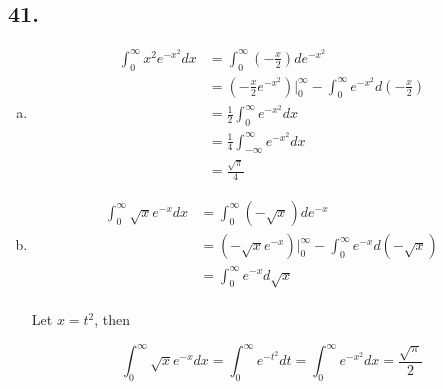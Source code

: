\documentclass{article}
\begin{document}
  \subsection*{41. }

  \begin{enumerate}[(a)]
    \item 

    $$\begin{aligned}
      \int_0^\infty x^2 e^{-x^2} dx &= \int_0^\infty (-\frac x 2)de^{-x^2} \\
      &= (-\frac x 2 e^{-x^2})\biggl|_0^\infty - \int_0^\infty e^{-x^2}d(-\frac x 2) \\
      &= \frac 1 2 \int_0^\infty e^{-x^2} dx \\
      &= \frac 1 4 \int_{-\infty}^\infty e^{-x^2} dx \\
      &= \frac{\sqrt \pi}{4} 
    \end{aligned}$$

    \item 

    $$\begin{aligned}
      \int_0^\infty \sqrt x e^{-x} dx &= \int_0^\infty (-\sqrt x) de^{-x} \\
      &= (-\sqrt x e^{-x})\biggl|_0^\infty - \int_0^\infty e^{-x} d(-\sqrt x) \\
      &= \int_0^\infty e^{-x} d\sqrt x \\
    \end{aligned}$$

    Let $x = t^2$, then

    $$\int_0^\infty \sqrt x e^{-x} dx = \int_0^\infty e^{-t^2}dt = \int_0^\infty e^{-x^2} dx = \frac{\sqrt \pi}{2}$$
  \end{enumerate}
\end{document}
